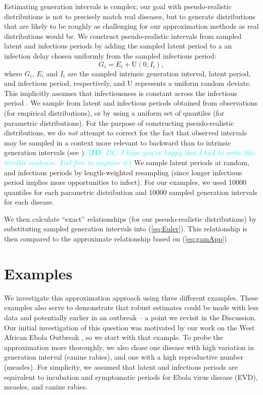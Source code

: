 \documentclass[12pt]{article}
\newcommand{\eref}[1]{(\ref{eq:#1})}
\newcommand{\comment}[3]{\textcolor{#1}{\textbf{[#2: }\textit{#3}\textbf{]}}}
\newcommand{\jd}[1]{\comment{cyan}{JD}{#1}}
\begin{document}
Estimating generation intervals is complex; our goal with pseudo-realistic distributions is not to precisely match real diseases, but to generate distributions that are likely to be roughly as challenging for our approximation methods as real distributions would be.
We construct pseudo-realistic intervals from sampled latent and infectious periods by adding the sampled latent period to a an infection delay chosen uniformly from the sampled infectious period:
\begin{equation}
	G_i = E_i + \mathrm{U}(0, I_i),
\end{equation}
where $G_i$, $E_i$ and $I_i$ are the sampled intrinsic generation interval, latent period, and infectious period, respectively, and $\mathrm{U}$ represents a uniform random deviate.
This implicitly assumes that infectiousness is constant across the infectious period \cite{HampDush09}.
We sample from latent and infectious periods obtained from observations (for empirical distributions), or by using a uniform set of quantiles (for parametric distributions).
For the purpose of constructing pseudo-realistic distributions, we do \emph{not} attempt to correct for the fact that observed intervals may be sampled in a context more relevant to backward than to intrinsic generation intervals (see \cite{ChamDush15}).
\jd{DC: I hope you're happy that I had to write this terrible sentence. Feel free to improve it.}
We sample latent periods at random, and infectious periods by length-weighted resampling (since longer infectious period implies more opportunities to infect).  
For our examples, we used 10000 quantiles for each parametric distribution and 10000 sampled generation intervals for each disease.

We then calculate ``exact'' relationships (for our pseudo-realistic distributions) by substituting sampled generation intervals into \eref{Euler}.
This relationship is then compared to the approximate relationship based on \eref{gamApp}

\section{Examples}
\label{Examples}

We investigate this approximation approach using three different examples. 
These examples also serve to demonstrate that robust estimates could be made with less data and potentially earlier in an outbreak -- a point we revisit in the Discussion.
Our initial investigation of this question was motivated by our work on the West African Ebola Outbreak \cite{WeitDush15}, so we start with that example. To probe the approximation more thoroughly, we also chose one disease with high variation in generation interval (canine rabies), and one with a high reproductive number (measles). For simplicity, we assumed that latent and infectious periods are equivalent to incubation and symptomatic periods for Ebola virus disease (EVD), measles, and canine rabies.
\end{document}
